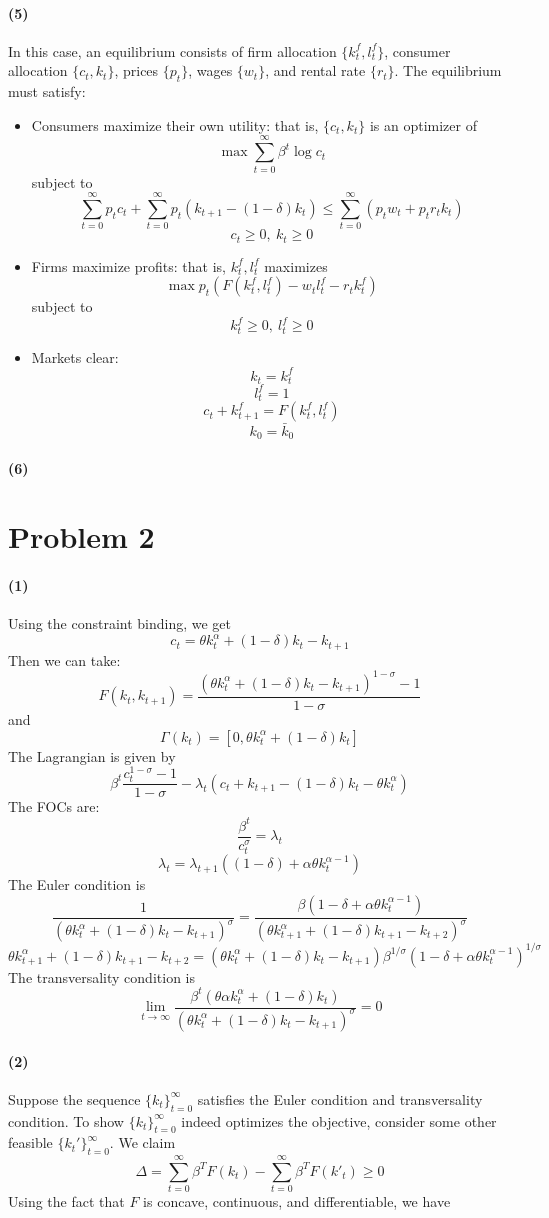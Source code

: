 \documentclass[10pt,letter]{article}
\newcommand{\problem}[1]{\section*{Problem #1}}
\newcommand{\problempart}[1]{\paragraph{#1}}
\begin{document}
\problempart{(5)}
In this case, an equilibrium consists of firm allocation $\{ k_t^f, l_t^f \}$, consumer allocation $\{ c_t, k_t \}$, prices $\{ p_t \}$, wages $\{ w_t \}$, and rental rate $\{ r_t \}$. The equilibrium must satisfy:
\begin{itemize}
\item Consumers maximize their own utility: that is, $\{c_t, k_t \}$ is an optimizer of
\[ \max \sum_{t=0}^\infty \beta^t \log c_t \]
subject to
\[ \sum_{t=0}^\infty p_t c_t + \sum_{t=0}^\infty p_t (k_{t+1} - (1-\delta)k_t)  \le \sum_{t=0}^\infty (p_t w_t + p_t r_t k_t) \]
\[ c_t\ge 0, \ k_t \ge 0 \]
\item Firms maximize profits: that is, $k_t^f, l_t^f$ maximizes
\[ \max p_t (F(k^f_t, l^f_t) - w_t l^f_t -r_t k^f_t) \]
subject to
\[k^f_t \ge 0, \ l^f_t \ge 0\]
\item Markets clear:
\[ k_t = k^f_t \]
\[ l_t^f = 1 \]
\[ c_t + k_{t+1}^f = F(k^f_t, l^f_t) \]
\[ k_0 = \bar{k}_0 \]
\end{itemize}
\problempart{(6)}
\problem{2}
\problempart{(1)}
Using the constraint binding, we get
\[ c_t = \theta k_t^\alpha + (1-\delta)k_t - k_{t+1} \]
Then we can take:
\[ F(k_t, k_{t+1}) = \frac{(\theta k_t^\alpha + (1-\delta)k_t - k_{t+1})^{1-\sigma} - 1}{1-\sigma} \]
and
\[ \Gamma(k_t) = [0, \theta k_t^\alpha + (1-\delta)k_t]\]
The Lagrangian is given by
\[ \beta^t \frac{c_t^{1-\sigma} -1}{1-\sigma} - \lambda_t (c_t + k_{t+1} -(1-\delta)k_t - \theta k_t^\alpha) \]
The FOCs are:
\[ \frac{\beta^t}{c_t^\sigma} = \lambda_t \]
\[ \lambda_{t} = \lambda_{t+1}((1-\delta) + \alpha \theta k_t^{\alpha - 1})  \]
The Euler condition is
\[ \frac{1}{(\theta k_t^\alpha + (1-\delta)k_t - k_{t+1})^\sigma} = \frac{\beta(1-\delta + \alpha \theta k_t^{\alpha - 1})}{(\theta k_{t+1}^\alpha + (1-\delta)k_{t+1} - k_{t+2})^\sigma} \]
\[ \theta k_{t+1}^\alpha + (1-\delta)k_{t+1} - k_{t+2} = (\theta k_t^\alpha + (1-\delta)k_t - k_{t+1}) \beta^{1/\sigma}(1-\delta + \alpha \theta k_t^{\alpha - 1})^{1/\sigma} \]
The transversality condition is
\[ \lim_{t\to\infty} \frac{\beta^t \left( \theta \alpha k_t^{\alpha} + (1 - \delta)k_t \right)}{(\theta k_t^\alpha + (1-\delta)k_t - k_{t+1})^{\sigma}}  = 0 \]
\problempart{(2)} Suppose the sequence $\{ k_t \}_{t=0}^\infty$ satisfies the Euler condition and transversality condition. To show $\{ k_t \}_{t=0}^\infty$ indeed optimizes the objective, consider some other feasible $\{ k_t' \}_{t=0}^\infty$. We claim
\[ \Delta = \sum_{t=0}^\infty \beta^T F(k_t) - \sum_{t=0}^\infty \beta^T F(k'_t) \ge 0 \]
Using the fact that $F$ is concave, continuous, and differentiable, we have
\end{document}
